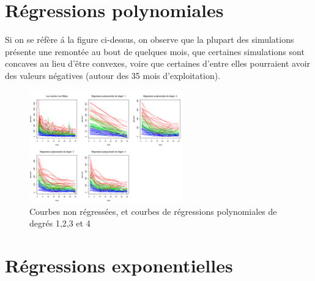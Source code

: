 \documentclass[12pt]{article}
\begin{document}
\small{
\tableofcontents 
}
\newpage


\section{R\'egressions polynomiales}
\label{sec:reg_pol}

Si on se r\'ef\`ere \'a la figure ci-dessus, on observe que la plupart des simulations
pr\'esente une remont\'ee au bout de quelques mois, que certaines simulations sont concaves
au lieu d'\^etre convexes, voire que certaines d'entre elles pourraient avoir des valeurs n\'egatives (autour des 35 mois d'exploitation).

 
\begin{figure}[H]
 \centering %
	\includegraphics[width=250px]{reg_pol}
  \caption{\label{fig:polynomial_regressions} Courbes non r\'egress\'ees, et courbes de r\'egressions polynomiales de degr\'es 1,2,3 et 4}
\end{figure}

\newpage


\section{R\'egressions exponentielles}
\end{document}
